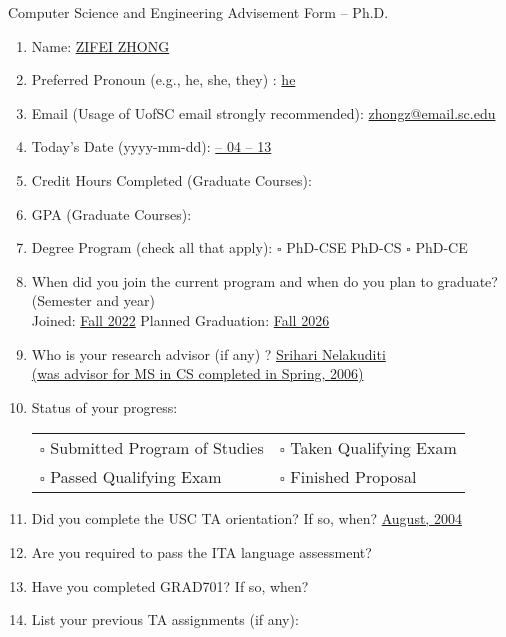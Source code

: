 \documentclass[11pt, oneside]{article}   	%
\begin{document}
\newpage
\centering \Large Computer Science and Engineering Advisement Form -- Ph.D.

\vspace{30pt}

\begin{enumerate}
\item Name: \underline{\quad ZIFEI ZHONG \quad}
\item Preferred Pronoun (e.g., he, she, they) : \underline{\quad he \quad}
\item Email (Usage of UofSC email strongly recommended): \underline{\quad zhongz@email.sc.edu \quad}
\item Today's Date (yyyy-mm-dd): \underline{ -- 04 -- 13 \quad}
\item Credit Hours Completed (Graduate Courses): \underline{ \quad}
\item GPA (Graduate Courses): \underline{ \quad}
\item Degree Program (check all that apply): $\square$ PhD-CSE \quad \makebox[0pt][l]{$\square$}\raisebox{.15ex}{\hspace{0.1em}$\checkmark$}  PhD-CS \quad $\square$ PhD-CE
\item When did you join the current program and when do you plan to graduate? (Semester and year)\\
 Joined: \underline{\quad Fall 2022\quad } \qquad Planned Graduation: \underline{\quad Fall 2026\quad}
\item Who is your research advisor (if any) ? \underline{\quad Srihari Nelakuditi \quad }\\
\underline{\quad (was advisor for MS in CS completed in Spring, 2006) \quad}
\item Status of your progress:\\
\begin{tabular}{l l}
$\square$ Submitted Program of Studies & $\square$ Taken Qualifying Exam\\
$\square$ Passed Qualifying Exam & $\square$ Finished Proposal
\end{tabular}
\item Did you complete the USC TA orientation? If so, when? \underline{\qquad August, 2004\qquad}
\item Are you required to pass the ITA language assessment? \underline{\qquad\qquad}
\item Have you completed GRAD701? If so, when? \underline{\qquad\qquad}
\item List your previous TA assignments (if any): 


\end{enumerate}
\end{document}
